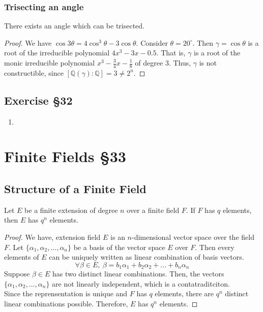 \subsubsection{Trisecting an angle}
\begin{theorem}
	There exists an angle which can be trisected.
\end{theorem}
\begin{proof}
	We have $\cos 3\theta = 4\cos^3 \theta - 3\cos \theta$. Consider $\theta = 20^\circ$. Then $\gamma = \cos \theta$ is a root of the irreducible polynomial $4x^3-3x-0.5$. That is, $\gamma$ is a root of the monic irreducible polynomial $x^3-\frac{3}{4}x-\frac{1}{8}$ of degree $3$. Thus, $\gamma$ is not constructible, since $[\mathbb{Q}(\gamma) : \mathbb{Q}] = 3 \ne 2^n$.
\end{proof}
\subsection{Exercise \S32}
\begin{enumerate}
	\item
\end{enumerate}

\section{Finite Fields \S33}
\subsection{Structure of a Finite Field}
\begin{theorem}
	Let $E$ be a finite extension of degree $n$ over a finite field $F$. If $F$ has $q$ elements, then $E$ has $q^n$ elements.
\end{theorem}
\begin{proof}
	We have, extension field $E$ is an $n$-dimensional vector space over the field $F$. Let $\{ \alpha_1, \alpha_2,\dots, \alpha_n \}$ be a basis of the vector space $E$ over $F$. Then every elements of $E$ can be uniquely written as linear combination of basis vectors.
\begin{equation*}
 	\forall \beta \in E,\ \beta = b_1 \alpha_1 + b_2 \alpha_2 + \dots + b_n \alpha_n
\end{equation*}
	Suppose $\beta \in E$ has two distinct linear combinations. Then, the vectors $\{ \alpha_1, \alpha_2,\dots,\alpha_n\}$ are not linearly independent, which is a contatraditciton.\\
	
	Since the reprensentation is unique and $F$ has $q$ elements, there are $q^n$ distinct linear combinations possible. Therefore, $E$ has $q^n$ elements.
\end{proof}

